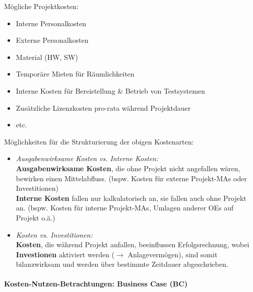 \documentclass[a4paper]{article}
\begin{document}
			Mögliche Projektkosten:
			
			\begin{itemize}
				\item Interne Personalkosten
				\item Externe Personalkosten
				\item Material (HW, SW)
				\item Temporäre Mieten für Räumlichkeiten
				\item Interne Kosten für Bereistellung \& Betrieb von Testsystemen
				\item Zusätzliche Lizenzkosten pro-rata während Projektdauer
				\item etc.
			\end{itemize}
			\vspace{1em}
			\noindent
			Möglichkeiten für die Strukturierung der obigen Kostenarten:
			
			\begin{itemize}
				\item \textit{Ausgabenwirksame Kosten vs. Interne Kosten:}\\
				\textbf{Ausgabenwirksame Kosten}, die ohne Projekt nicht angefallen wären, bewirken einen Mittelabfluss.
				(bspw. Kosten für externe Projekt-MAs oder Investitionen)\\
				\textbf{Interne Kosten} fallen nur kalkulatorisch an, sie fallen auch ohne Projekt an.
				(bspw. Kosten für interne Projekt-MAs, Umlagen anderer OEs auf Projekt o.ä.)
				
				\item \textit{Kosten vs. Investitionen:}\\
				\textbf{Kosten}, die während Projekt anfallen, beeinflussen Erfolgsrechnung, wobei \textbf{Investionen} aktiviert werden ($\rightarrow$ Anlagevermögen), sind somit bilanzwirksam und werden über bestimmte Zeitdauer abgeschrieben.
			\end{itemize}
			
\newpage

			\paragraph{Kosten-Nutzen-Betrachtungen: Business Case (BC)}
			
\end{document}
